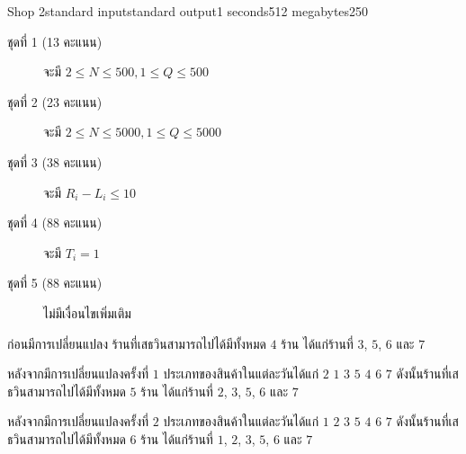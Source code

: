 \documentclass[11pt,a4paper]{article}
\begin{document}
\begin{problem}{Shop 2}{standard input}{standard output}{1 seconds}{512 megabytes}{250}
\begin{description}
\item[ชุดที่ 1 (13 คะแนน)] จะมี $2\leq N\leq 500,1\leq Q\leq 500$
\item[ชุดที่ 2 (23 คะแนน)] จะมี $2\leq N\leq 5000,1\leq Q\leq 5000$
\item[ชุดที่ 3 (38 คะแนน)] จะมี $R_i-L_i\leq 10$
\item[ชุดที่ 4 (88 คะแนน)] จะมี $T_i=1$
\item[ชุดที่ 5 (88 คะแนน)] ไม่มีเงื่อนไขเพิ่มเติม

\end{description}

\Examples

\begin{example}
%
\end{example}

\Note

ก่อนมีการเปลี่ยนแปลง ร้านที่เสธวินสามารถไปได้มีทั้งหมด $4$ ร้าน ได้แก่ร้านที่ $3$, $5$, $6$ และ $7$

หลังจากมีการเปลี่ยนแปลงครั้งที่ $1$ ประเภทของสินค้าในแต่ละวันได้แก่ $2$ $1$ $3$ $5$ $4$ $6$ $7$ ดังนั้นร้านที่เสธวินสามารถไปได้มีทั้งหมด $5$ ร้าน ได้แก่ร้านที่ $2$, $3$, $5$, $6$ และ $7$

หลังจากมีการเปลี่ยนแปลงครั้งที่ $2$ ประเภทของสินค้าในแต่ละวันได้แก่ $1$ $2$ $3$ $5$ $4$ $6$ $7$ ดังนั้นร้านที่เสธวินสามารถไปได้มีทั้งหมด $6$ ร้าน ได้แก่ร้านที่ $1$, $2$, $3$, $5$, $6$ และ $7$

\end{problem}
\end{document}
